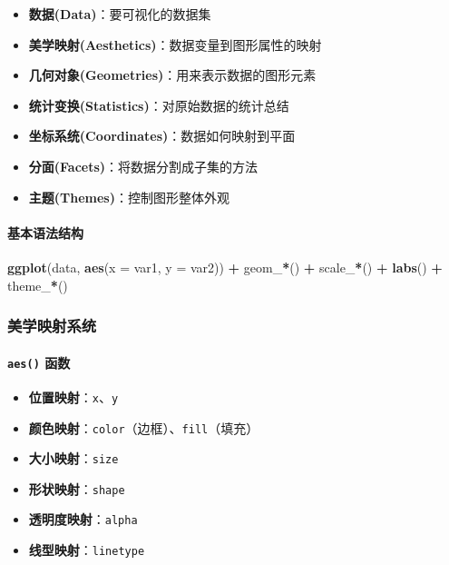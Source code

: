 \documentclass[
  twoside]{book}
\newenvironment{Shaded}{\begin{snugshade}}{\end{snugshade}}
\newcommand{\AttributeTok}[1]{\textcolor[rgb]{0.13,0.29,0.53}{#1}}
\newcommand{\FunctionTok}[1]{\textcolor[rgb]{0.13,0.29,0.53}{\textbf{#1}}}
\newcommand{\NormalTok}[1]{#1}
\newcommand{\SpecialCharTok}[1]{\textcolor[rgb]{0.81,0.36,0.00}{\textbf{#1}}}
\providecommand{\tightlist}{%
  \setlength{\itemsep}{0pt}\setlength{\parskip}{0pt}}
\begin{document}
\begin{itemize}
\tightlist
\item
  \textbf{数据(Data)}：要可视化的数据集
\item
  \textbf{美学映射(Aesthetics)}：数据变量到图形属性的映射
\item
  \textbf{几何对象(Geometries)}：用来表示数据的图形元素
\item
  \textbf{统计变换(Statistics)}：对原始数据的统计总结
\item
  \textbf{坐标系统(Coordinates)}：数据如何映射到平面
\item
  \textbf{分面(Facets)}：将数据分割成子集的方法
\item
  \textbf{主题(Themes)}：控制图形整体外观
\end{itemize}

\hypertarget{ux57faux672cux8bedux6cd5ux7ed3ux6784}{%
\paragraph{基本语法结构}\label{ux57faux672cux8bedux6cd5ux7ed3ux6784}}

\begin{Shaded}
\begin{Highlighting}[]
\FunctionTok{ggplot}\NormalTok{(data, }\FunctionTok{aes}\NormalTok{(}\AttributeTok{x =}\NormalTok{ var1, }\AttributeTok{y =}\NormalTok{ var2)) }\SpecialCharTok{+}
\NormalTok{  geom\_}\SpecialCharTok{*}\NormalTok{() }\SpecialCharTok{+}
\NormalTok{  scale\_}\SpecialCharTok{*}\NormalTok{() }\SpecialCharTok{+}
  \FunctionTok{labs}\NormalTok{() }\SpecialCharTok{+}
\NormalTok{  theme\_}\SpecialCharTok{*}\NormalTok{()}
\end{Highlighting}
\end{Shaded}

\hypertarget{ux7f8eux5b66ux6620ux5c04ux7cfbux7edf}{%
\subsubsection{美学映射系统}\label{ux7f8eux5b66ux6620ux5c04ux7cfbux7edf}}

\hypertarget{aes-ux51fdux6570}{%
\paragraph{\texorpdfstring{\texttt{aes()} 函数}{aes() 函数}}\label{aes-ux51fdux6570}}

\begin{itemize}
\tightlist
\item
  \textbf{位置映射}：\texttt{x}、\texttt{y}
\item
  \textbf{颜色映射}：\texttt{color}（边框）、\texttt{fill}（填充）
\item
  \textbf{大小映射}：\texttt{size}
\item
  \textbf{形状映射}：\texttt{shape}
\item
  \textbf{透明度映射}：\texttt{alpha}
\item
  \textbf{线型映射}：\texttt{linetype}
\end{itemize}
\end{document}
